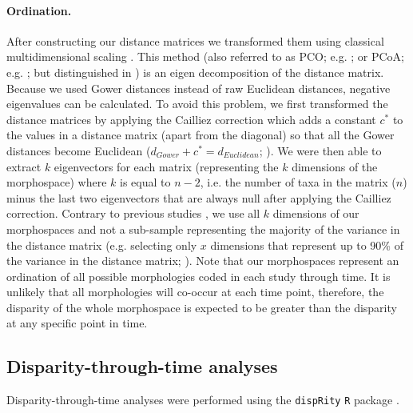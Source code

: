 \documentclass[12pt,a4paper]{article}
\begin{document}
\paragraph{Ordination.}
After constructing our distance matrices we transformed them using classical multidimensional scaling \citep[MDS;][]{torgerson1965multidimensional,GOWER01121966,cailliez1983analytical}.
This method (also referred to as PCO; e.g. \citealt{Brusatte2015}; or PCoA; e.g. \citealt{paradisape:2004}; but distinguished in \citealt{legendre2012numerical}) is an eigen decomposition of the distance matrix.
Because we used Gower distances instead of raw Euclidean distances, negative eigenvalues can be calculated.
To avoid this problem, we first transformed the distance matrices by applying the Cailliez correction \citep{cailliez1983analytical} which adds a constant $c^*$ to the values in a distance matrix (apart from the diagonal) so that all the Gower distances become Euclidean ($d_{Gower}+c^*=d_{Euclidean}$; \citealt{cailliez1983analytical}). 
We were then able to extract $k$ eigenvectors for each matrix (representing the $k$ dimensions of the morphospace) where $k$ is equal to $n-2$, i.e. the number of taxa in the matrix ($n$) minus the last two eigenvectors that are always null after applying the Cailliez correction.
Contrary to previous studies \citep[e.g][]{brusatte50,cisneros2010,prentice2011,anderson2012using,Hughes20082013,bentonmodels2014}, we use all $k$ dimensions of our morphospaces and not a sub-sample representing the majority of the variance in the distance matrix (e.g. selecting only $x$ dimensions that represent up to 90\% of the variance in the distance matrix; \citealt{Brusatte12092008,toljagictriassic-jurassic2013}).
Note that our morphospaces represent an ordination of all possible morphologies coded in each study through time.
It is unlikely that all morphologies will co-occur at each time point, therefore, the disparity of the whole morphospace is expected to be greater than the disparity at any specific point in time.

\subsection{Disparity-through-time analyses}

Disparity-through-time analyses were performed using the \texttt{dispRity} \texttt{R} package \citep{dispRity.v02}. 
\end{document}
